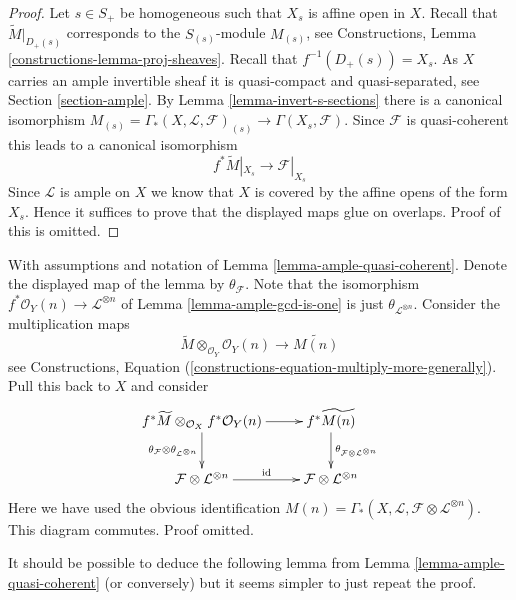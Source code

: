 \begin{proof}
Let $s \in S_{+}$ be homogeneous such that $X_s$ is affine open in $X$.
Recall that $\widetilde{M}|_{D_{+}(s)}$ corresponds to the
$S_{(s)}$-module $M_{(s)}$, see
Constructions, Lemma \ref{constructions-lemma-proj-sheaves}.
Recall that $f^{-1}(D_{+}(s)) = X_s$.
As $X$ carries an ample invertible sheaf it is quasi-compact and
quasi-separated, see Section \ref{section-ample}.
By Lemma \ref{lemma-invert-s-sections} there is a canonical isomorphism
$M_{(s)} = \Gamma_*(X, \mathcal{L}, \mathcal{F})_{(s)} \to
\Gamma(X_s, \mathcal{F})$.
Since $\mathcal{F}$ is quasi-coherent this leads to
a canonical isomorphism
$$
f^*\widetilde{M}|_{X_s} \to \mathcal{F}|_{X_s}
$$
Since $\mathcal{L}$ is ample on $X$ we know that $X$ is covered
by the affine opens of the form $X_s$. Hence it suffices to prove
that the displayed maps glue on overlaps. Proof of this is
omitted.
\end{proof}

\begin{remark}
\label{remark-neurotic}
With assumptions and notation of Lemma \ref{lemma-ample-quasi-coherent}.
Denote the displayed map of the lemma by $\theta_\mathcal{F}$.
Note that the isomorphism $f^*\mathcal{O}_Y(n) \to \mathcal{L}^{\otimes n}$
of Lemma \ref{lemma-ample-gcd-is-one} is just
$\theta_{\mathcal{L}^{\otimes n}}$.
Consider the multiplication maps
$$
\widetilde{M} \otimes_{\mathcal{O}_Y} \mathcal{O}_Y(n)
\longrightarrow
\widetilde{M(n)}
$$
see
Constructions, Equation (\ref{constructions-equation-multiply-more-generally}).
Pull this back to $X$ and consider
$$
\xymatrix{
f^*\widetilde{M} \otimes_{\mathcal{O}_X} f^*\mathcal{O}_Y(n)
\ar[r]
\ar[d]_{\theta_\mathcal{F} \otimes \theta_{\mathcal{L}^{\otimes n}}}
&
f^*\widetilde{M(n)}
\ar[d]^{\theta_{\mathcal{F} \otimes \mathcal{L}^{\otimes n}}}
\\
\mathcal{F} \otimes \mathcal{L}^{\otimes n} \ar[r]^{\text{id}} &
\mathcal{F} \otimes \mathcal{L}^{\otimes n}
}
$$
Here we have used the obvious identification
$M(n) = \Gamma_*(X, \mathcal{L}, \mathcal{F} \otimes \mathcal{L}^{\otimes n})$.
This diagram commutes. Proof omitted.
\end{remark}

\noindent
It should be possible to deduce the following lemma from
Lemma \ref{lemma-ample-quasi-coherent} (or conversely) but it seems
simpler to just repeat the proof.

